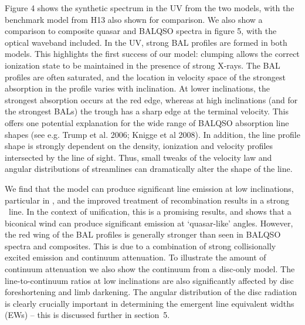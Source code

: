 \documentclass[preprint, a4paper, 11pt]{aastex}
\begin{document}
Figure 4 shows the synthetic spectrum in the UV from the two models, with the
benchmark model from H13 also shown for comparison. We also show a comparison
to composite quasar and BALQSO spectra in figure 5, with the optical waveband 
included. In the UV, strong BAL profiles are formed in both models. This
highlights the first success of our model: clumping allows the correct ionization state 
to be maintained in the presence of strong X-rays. 
The BAL profiles are often saturated, and the location in velocity space
of the strongest absorption in the profile varies with inclination.
At lower inclinations, the strongest absorption occurs at the red edge,
whereas at high inclinations (and for the strongest BALs)
the trough has a sharp edge at the terminal velocity.
This offers one potential explanation for the wide range of BALQSO absorption
line shapes (see e.g. Trump et al. 2006; Knigge et al 2008).
In addition, the line profile shape is strongly dependent 
on the density, ionization and velocity 
profiles intersected by the line of sight. Thus, small tweaks of the velocity
law and angular distributions of streamlines can dramatically alter
the shape of the line.

We find that the model can produce significant line emission
at low inclinations, particular in \civ, 
and the improved treatment of recombination results in a strong \la\
line. In the context of unification, this is a promising results, 
and shows that a biconical wind can produce significant 
emission at `quasar-like' angles.
However, the red wing of the BAL profiles 
is generally stronger than seen in BALQSO spectra and composites.
This is due to a combination of strong collisionally excited emission
and continuum attenuation. To illustrate the amount of 
continuum attenuation we also show the continuum from a disc-only model.
The line-to-continuum ratios at low inclinations are also
significantly affected by disc foreshortening and limb darkening.
The angular distribution of the disc radiation is clearly
crucially important in determining the emergent line equivalent widths 
(EWs) -- this is discussed further in section~5.
\end{document}
